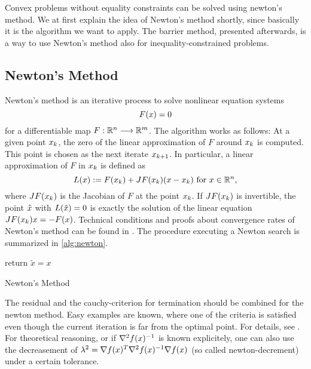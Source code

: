 Convex problems without equality constraints can be solved using newton's method. We at first explain the idea of Newton's method shortly, since basically it is the algorithm we want to apply. The barrier method, presented afterwards, is a way to use Newton's method also for inequality-constrained problems.

\subsection{Newton's Method}
Newton's method is an iterative process to solve nonlinear equation systems
\begin{equation}
F(x)= 0
\end{equation}
for a differentiable map $ F: \mathbb{R}^n \longrightarrow \mathbb{R}^m $. The algorithm works as follows: At a given point $ x_k $, the zero of the linear approximation of $ F $ around $ x_k $  is computed. This point is chosen as the next iterate $ x_{k+1} $. In particular, a linear approximation of $ F $ in  $ x_k $ is defined as
\begin{equation}
L(x):= F(x_k) + J F (x_k)(x - x_k) \text{ for } x\in \mathbb{R}^n,
\end{equation}
where $ J F (x_k) $ is the Jacobian of $ F $ at the point $ x_k $. If $ J F (x_k) $ is invertible, the point $ \tilde{x} $ with $ L(\tilde{x})=0 $ is exactly the solution of  the linear equation $ J F (x_k) x = -F(x) $.
Technical conditions and proofs about convergence rates of Newton's method can be found in \cite{SO}.
The procedure executing a Newton search is summarized in \eqref{alg:newton}.

\begin{algorithm}
	\SetAlgoLined
	\BlankLine
	return $ \tilde{x} = x $\;
	\caption{Newton's Method}
	\label{alg:newton}
\end{algorithm}

\begin{remark}\label{re:newtonStop}
	The residual and the cauchy-criterion for termination should be combined for the newton method. Easy examples are known, where one of the criteria is satisfied even though the current iteration is far from the optimal point. For details, see \cite{SO}.
	For theoretical reasoning, or if $ \nabla^2 f(x)^{-1} $ is known explicitely, one can also use the decreasement of $ \lambda^2 = \nabla f(x) ^T \nabla^2 f(x)^{-1} \nabla f(x)$ (so called newton-decrement) under a certain tolerance.
\end{remark}

